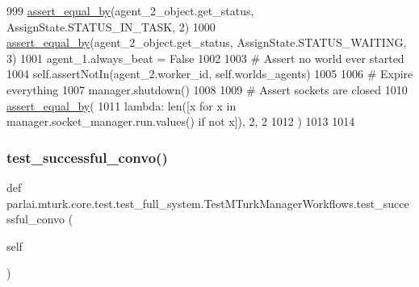 \begin{DoxyCode}
999         \hyperlink{namespaceparlai_1_1mturk_1_1core_1_1test_1_1test__full__system_a0b463246d35658a2e422010f13dcf819}{assert\_equal\_by}(agent\_2\_object.get\_status, AssignState.STATUS\_IN\_TASK, 2)
1000         \hyperlink{namespaceparlai_1_1mturk_1_1core_1_1test_1_1test__full__system_a0b463246d35658a2e422010f13dcf819}{assert\_equal\_by}(agent\_2\_object.get\_status, AssignState.STATUS\_WAITING, 3)
1001         agent\_1.always\_beat = \textcolor{keyword}{False}
1002 
1003         \textcolor{comment}{# Assert no world ever started}
1004         self.assertNotIn(agent\_2.worker\_id, self.worlds\_agents)
1005 
1006         \textcolor{comment}{# Expire everything}
1007         manager.shutdown()
1008 
1009         \textcolor{comment}{# Assert sockets are closed}
1010         \hyperlink{namespaceparlai_1_1mturk_1_1core_1_1test_1_1test__full__system_a0b463246d35658a2e422010f13dcf819}{assert\_equal\_by}(
1011             \textcolor{keyword}{lambda}: len([x \textcolor{keywordflow}{for} x \textcolor{keywordflow}{in} manager.socket\_manager.run.values() \textcolor{keywordflow}{if} \textcolor{keywordflow}{not} x]), 2, 2
1012         )
1013 
1014 
\end{DoxyCode}
\mbox{\label{classparlai_1_1mturk_1_1core_1_1test_1_1test__full__system_1_1TestMTurkManagerWorkflows_a57d2c60bcdf0e907cb6c67873d2c4b24}} 
\subsubsection{\texorpdfstring{test\+\_\+successful\+\_\+convo()}{test\_successful\_convo()}}
{\footnotesize\ttfamily def parlai.\+mturk.\+core.\+test.\+test\+\_\+full\+\_\+system.\+Test\+M\+Turk\+Manager\+Workflows.\+test\+\_\+successful\+\_\+convo (\begin{DoxyParamCaption}\item[{}]{self }\end{DoxyParamCaption})}



